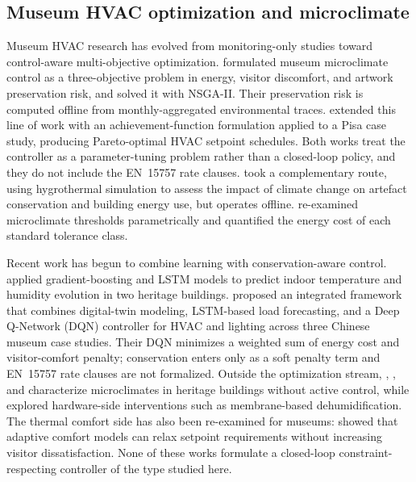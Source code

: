 \documentclass[11pt,a4paper]{article}
\begin{document}
\subsection{Museum HVAC optimization and microclimate}

Museum HVAC research has evolved from monitoring-only studies toward
control-aware multi-objective optimization. \citet{ascione2018museum}
formulated museum microclimate control as a three-objective problem in
energy, visitor discomfort, and artwork preservation risk, and solved it
with NSGA-II. Their preservation risk is computed offline from
monthly-aggregated environmental traces.
\citet{schito2020museum} extended this line of work with an
achievement-function formulation applied to a Pisa case study, producing
Pareto-optimal HVAC setpoint schedules. Both works treat the controller
as a parameter-tuning problem rather than a closed-loop policy, and they
do not include the EN~15757 rate clauses.
\citet{coelho2020museum} took a complementary route, using hygrothermal
simulation to assess the impact of climate change on artefact
conservation and building energy use, but operates offline. \citet{verticchio2024microclimate} re-examined
microclimate thresholds parametrically and quantified the energy cost of
each standard tolerance class.

Recent work has begun to combine learning with conservation-aware
control. \citet{boesgaard2022heritage} applied gradient-boosting and
LSTM models to predict indoor temperature and humidity evolution in two
heritage buildings. \citet{green_smart_museums_2025} proposed an
integrated framework that combines digital-twin modeling, LSTM-based load
forecasting, and a Deep Q-Network (DQN) controller for HVAC and lighting
across three Chinese museum case studies. Their DQN minimizes a weighted
sum of energy cost and visitor-comfort penalty; conservation enters only
as a soft penalty term and EN~15757 rate clauses are not formalized.
Outside the optimization stream, \citet{museum_no_hvac_2025},
\citet{greek_museum_2024}, and \citet{coherence_heritage_2025}
characterize microclimates in heritage buildings without active control,
while \citet{membrane_dehumid_museum_2025} explored hardware-side
interventions such as membrane-based dehumidification. The thermal
comfort side has also been re-examined for museums:
\citet{mudejar2024adaptive} showed that adaptive comfort models
\citep{ashrae552020,en167982020} can relax setpoint requirements without
increasing visitor dissatisfaction. None of these works formulate a
closed-loop constraint-respecting controller of the type studied here.
\end{document}

